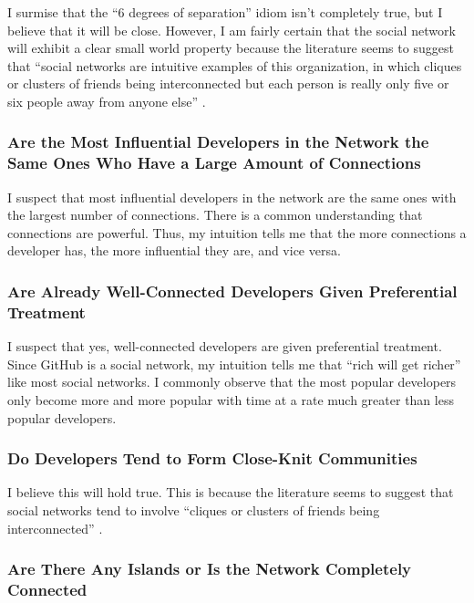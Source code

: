 \documentclass[9pt,twocolumn,twoside]{pnas-new}
\begin{document}
I surmise that the “6 degrees of separation” idiom isn't completely true, but I believe that it will be close. However, I am fairly certain that the social network will exhibit a clear small world property because the literature seems to suggest that “social networks are intuitive examples of this organization, in which cliques or clusters of friends being interconnected but each person is really only five or six people away from anyone else” \cite{PMC3604768}.

\subsubsection{Are the Most Influential Developers in the Network the Same Ones Who Have a Large Amount of Connections}

I suspect that most influential developers in the network are the same ones with the largest number of connections. There is a common understanding that connections are powerful. Thus, my intuition tells me that the more connections a developer has, the more influential they are, and vice versa.

\subsubsection{Are Already Well-Connected Developers Given Preferential Treatment}

I suspect that yes, well-connected developers are given preferential treatment. Since GitHub is a social network, my intuition tells me that “rich will get richer” like most social networks. I commonly observe that the most popular developers only become more and more popular with time at a rate much greater than less popular developers.

\subsubsection{Do Developers Tend to Form Close-Knit Communities}

I believe this will hold true. This is because the literature seems to suggest that social networks tend to involve “cliques or clusters of friends being interconnected” \cite{PMC3604768}.

\subsubsection{Are There Any Islands or Is the Network Completely Connected}
\end{document}
